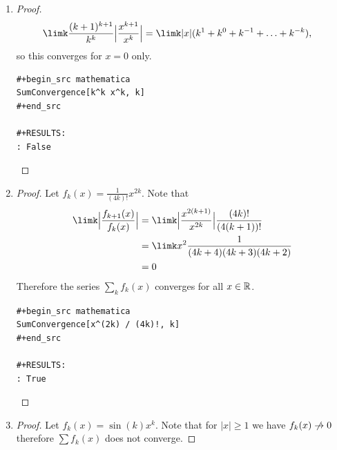 \documentclass[12pt]{article}
\begin{document}
\begin{enumerate}[label=(\alph*)]
\begin{proof}
\begin{verbatim}
#+begin_src mathematica
SumConvergence[2^k x^(k!), k]
#+end_src

#+RESULTS:
: SumConvergence[2^k*x^k!, k]

\end{verbatim}

  \end{proof}

\item
  \begin{proof}
    \begin{align*}
      \limk \frac{(k+1)^{k+1}}{k^k} \Big|\frac{x^{k+1}}{x^k}\Big|
      &= \limk |x| (k^1 + k^0 + k^{-1} + \ldots + k^{-k}),
    \end{align*}
    so this converges for $x=0$ only.

\begin{verbatim}
#+begin_src mathematica
SumConvergence[k^k x^k, k]
#+end_src

#+RESULTS:
: False

\end{verbatim}



  \end{proof}

\item
  \begin{proof}
    Let $f_k(x) = \frac{1}{(4k)!}x^{2k}$. Note that
    \begin{align*}
      \limk \Big|\frac{f_{k+1}(x)}{f_k(x)}\Big|
      &= \limk \Big| \frac{x^{2(k+1)}}{x^{2k}}\Big|\frac{(4k)!}{(4(k+1))!}\\
      &= \limk x^2 \frac{1}{(4k+4)(4k+3)(4k+2)}\\
      &= 0
    \end{align*}
    Therefore the series $\sum_k f_k(x)$ converges for all $x \in \mathbb{R}$.

\begin{verbatim}
#+begin_src mathematica
SumConvergence[x^(2k) / (4k)!, k]
#+end_src

#+RESULTS:
: True

\end{verbatim}
\checkmark

  \end{proof}

\item
  \begin{proof}
    Let $f_k(x) = \sin(k)x^k$. Note that for $|x| \geq 1$ we have $f_k(x) \centernot\to 0$
    therefore $\sum f_k(x)$ does not converge.


\end{proof}
\end{enumerate}
\end{document}
